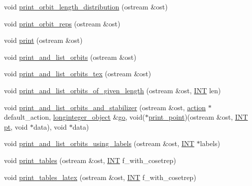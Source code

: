 \begin{DoxyCompactItemize}
void \mbox{\hyperlink{classschreier_a0464626aa62056d355b34898518c4589}{print\+\_\+orbit\+\_\+length\+\_\+distribution}} (ostream \&ost)
\item 
void \mbox{\hyperlink{classschreier_aa0c08a86ca9fac0ae4fce8bffd3c7161}{print\+\_\+orbit\+\_\+reps}} (ostream \&ost)
\item 
void \mbox{\hyperlink{classschreier_a7b5a4341c51edb58100384ce87700749}{print}} (ostream \&ost)
\item 
void \mbox{\hyperlink{classschreier_a601f9c08d5a6f37f849d22fa4e89d892}{print\+\_\+and\+\_\+list\+\_\+orbits}} (ostream \&ost)
\item 
void \mbox{\hyperlink{classschreier_a7f8765a19e7c786b37d252fcd2c37a35}{print\+\_\+and\+\_\+list\+\_\+orbits\+\_\+tex}} (ostream \&ost)
\item 
void \mbox{\hyperlink{classschreier_a96dec1cd546348e961cc1f6750d152ed}{print\+\_\+and\+\_\+list\+\_\+orbits\+\_\+of\+\_\+given\+\_\+length}} (ostream \&ost, \mbox{\hyperlink{galois_8h_a09fddde158a3a20bd2dcadb609de11dc}{I\+NT}} len)
\item 
void \mbox{\hyperlink{classschreier_ad6b4fa4094b8c359f67b73fa73d7a159}{print\+\_\+and\+\_\+list\+\_\+orbits\+\_\+and\+\_\+stabilizer}} (ostream \&ost, \mbox{\hyperlink{classaction}{action}} $\ast$default\+\_\+action, \mbox{\hyperlink{classlonginteger__object}{longinteger\+\_\+object}} \&\mbox{\hyperlink{simeon_8_c_a1516b736c8ebbfb03a9dd7d8826cd9a6}{go}}, void($\ast$\mbox{\hyperlink{top__level_8h_a2bde441010b814b154aea558c1272280}{print\+\_\+point}})(ostream \&ost, \mbox{\hyperlink{galois_8h_a09fddde158a3a20bd2dcadb609de11dc}{I\+NT}} \mbox{\hyperlink{clique__finder_8_c_aec1f1a2b30fdca8844c2932384483145}{pt}}, void $\ast$data), void $\ast$data)
\item 
void \mbox{\hyperlink{classschreier_acd69bf19aa5ce441c7cd0c3fdc32ad44}{print\+\_\+and\+\_\+list\+\_\+orbits\+\_\+using\+\_\+labels}} (ostream \&ost, \mbox{\hyperlink{galois_8h_a09fddde158a3a20bd2dcadb609de11dc}{I\+NT}} $\ast$labels)
\item 
void \mbox{\hyperlink{classschreier_a5716ca3378149c1f21f642395d7831fb}{print\+\_\+tables}} (ostream \&ost, \mbox{\hyperlink{galois_8h_a09fddde158a3a20bd2dcadb609de11dc}{I\+NT}} f\+\_\+with\+\_\+cosetrep)
\item 
void \mbox{\hyperlink{classschreier_ae93a81953cef362ac7cec6f33b39eb6a}{print\+\_\+tables\+\_\+latex}} (ostream \&ost, \mbox{\hyperlink{galois_8h_a09fddde158a3a20bd2dcadb609de11dc}{I\+NT}} f\+\_\+with\+\_\+cosetrep)
\item 

\end{DoxyCompactItemize}
